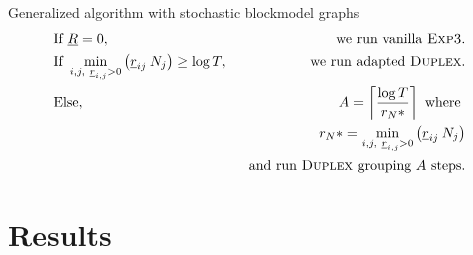\documentclass[11pt]{beamer}
\begin{document}
\begin{frame}{Generalized algorithm with stochastic blockmodel graphs}
\begin{align*}
&\text{If }\underline{R}=0,\ & \text{ we run vanilla } \textsc{Exp3}.\\
&\text{If } \min_{i,j,\ \underline{r}_{i,j}>0} \left(\underline{r}_{ij}\: N_j \right) \geq \log T ,\  & \text{ we run adapted }\textsc{Duplex}. \\
&\text{Else},\ & A =\left\lceil \frac{\log T}{r_N*} \right\rceil \text{ where }\\
& & r_N*=\min_{i,j,\ \underline{r}_{i,j}>0} \left(\underline{r}_{ij}\: N_j \right) \\
& & \text{ and run } \textsc{Duplex} \text{ grouping } A \text{ steps}.  
\end{align*}
\end{frame}

\section{Results}
\end{document}
